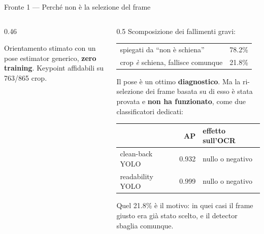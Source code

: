 \documentclass[aspectratio=169,10pt]{beamer}
\begin{document}
\begin{frame}{Fronte 1 --- Perché non è la selezione del frame}
  \begin{columns}[T]
    \begin{column}{0.46\textwidth}
      \centering
      \vspace{1.2em}

      \footnotesize
      Orientamento stimato con un pose estimator generico, \textbf{zero
      training}. Keypoint affidabili su 763/865 crop.
    \end{column}
    \begin{column}{0.5\textwidth}
      \small
      Scomposizione dei fallimenti gravi:
      \vspace{0.3em}
      \begin{center}\footnotesize
      \begin{tabular}{lr}
        \toprule
        spiegati da ``non è schiena'' & 78.2\% \\
        crop \emph{è} schiena, fallisce comunque & 21.8\% \\
        \bottomrule
      \end{tabular}
      \end{center}
      \vspace{0.5em}
      Il pose è un ottimo \textbf{diagnostico}. Ma la ri-selezione dei frame
      basata su di esso è stata provata e \textbf{non ha funzionato}, come due
      classificatori dedicati:
      \vspace{0.3em}
      \begin{center}\footnotesize
      \begin{tabular}{lrl}
        \toprule
        & AP & effetto sull'OCR \\
        \midrule
        clean-back YOLO & 0.932 & nullo o negativo \\
        readability YOLO & 0.999 & nullo o negativo \\
        \bottomrule
      \end{tabular}
      \end{center}
      \vspace{0.4em}
      Quel 21.8\% è il motivo: in quei casi il frame giusto era già stato
      scelto, e il detector sbaglia comunque.
    \end{column}
  \end{columns}
\end{frame}
\end{document}
